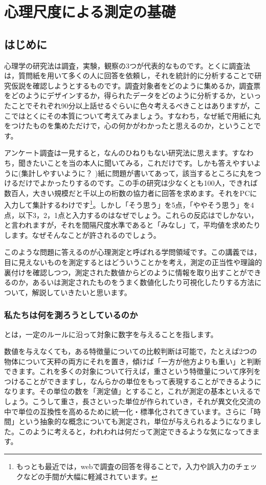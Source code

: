 \documentclass{ltjsbook}
\begin{document}
\chapter{心理尺度による測定の基礎}
\label{H01_PsychlogicalScaling}
\section{はじめに}
心理学の研究法は調査，実験，観察の3つが代表的なものです。とくに調査法は，質問紙を用いて多くの人に回答を依頼し，それを統計的に分析することで研究仮説を確認しようとするものです。調査対象者をどのように集めるか，調査票をどのようにデザインするか，得られたデータをどのように分析するか，といったことでそれぞれ90分以上話せるぐらいに色々考えるべきことはありますが，ここではとくにその本質について考えてみましょう。すなわち，なぜ紙で用紙に丸をつけたものを集めただけで，心の何かがわかったと思えるのか，ということです。

アンケート調査は一見すると，なんのひねりもない研究法に思えます。すなわち，聞きたいことを当の本人に聞いてみる，これだけです。しかも答えやすいように(集計しやすいように？ )紙に問題が書いてあって，該当するところに丸をつけるだけでよかったりするのです。この手の研究は少なくとも100人，できれば数百人，大きい規模だと千以上の桁数の協力者に回答を求めます。それをPCに入力して集計するわけです\footnote{もっとも最近では，webで調査の回答を得ることで，入力や誤入力のチェックなどの手間が大幅に軽減されています。}。しかし「そう思う」を5点，「ややそう思う」を4点，以下3，2，1点と入力するのはなぜでしょう。これらの反応はでしかない，と言われますが，それを間隔尺度水準であると「みなし」て，平均値を求めたりします。なぜそんなことが許されるのでしょう。

このような問題に答えるのが心理測定と呼ばれる学問領域です。この講義では，目に見えないものを測定するとはどういうことかを考え，測定の正当性や理論的裏付けを確認しつつ，測定された数値からどのように情報を取り出すことができるのか，あるいは測定されたものをうまく数値化したり可視化したりする方法について，解説していきたいと思います。

\subsection{私たちは何を測ろうとしているのか}

とは，一定のルールに沿って対象に数字を与えることを指します。

数値を与えなくても，ある特徴量についての比較判断は可能で，たとえば2つの物体について天秤の両方にそれを置き，傾けば「一方が他方よりも重い」と判断できます。これを多くの対象について行えば，重さという特徴量について序列をつけることができますし，なんらかの単位をもって表現することができるようになります。その単位の数を「測定値」とすること，これが測定の基本といえるでしょう。こうして重さ，長さといった単位が作られていき，それが異文化交流の中で単位の互換性を高めるために統一化・標準化されてきています。さらに「時間」という抽象的な概念についても測定され，単位が与えられるようになりました。このように考えると，われわれは何だって測定できるような気になってきます。
\end{document}
